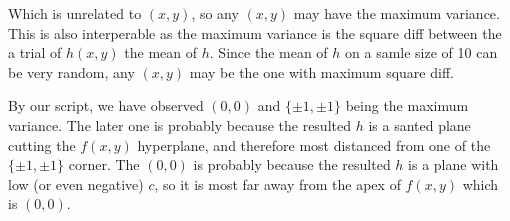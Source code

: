 \documentclass[12pt]{article}
\begin{document}
Which is unrelated to $(x, y)$, so any $(x, y)$ may have the maximum variance. This is also interperable as the maximum variance is the square diff between the a trial of $h(x, y)$ the mean of $h$. Since the mean of $h$ on a samle size of 10 can be very random, any $(x, y)$ may be the one with maximum square diff.

By our script, we have observed $(0, 0)$ and $\{\pm 1, \pm 1\}$ being the maximum variance. The later one is probably because the resulted $h$ is a santed plane cutting the $f(x, y)$ hyperplane, and therefore most distanced from one of the $\{\pm 1, \pm 1\}$ corner. The $(0, 0)$ is probably because the resulted $h$ is a plane with low (or even negative) $c$, so it is most far away from the apex of $f(x, y)$ which is $(0, 0)$.

% 
% 
\end{document}
